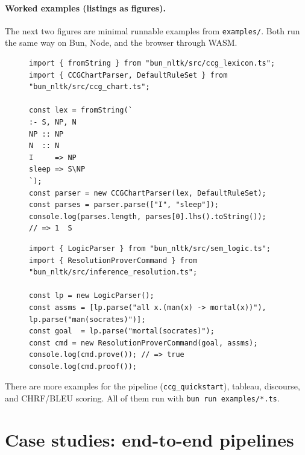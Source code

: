 \documentclass[smallextended]{svjour3}
\begin{document}
\paragraph{Worked examples (listings as figures).}

The next two figures are minimal runnable examples from \texttt{examples/}. Both run the same way on Bun, Node, and the browser through WASM.

\begin{figure}[H]
\begin{lstlisting}[caption={Example: CCG chart parse ``I sleep'' $\Rightarrow$ S (\texttt{examples/ccg\_quickstart.ts}).},label={lst:ccg}]
import { fromString } from "bun_nltk/src/ccg_lexicon.ts";
import { CCGChartParser, DefaultRuleSet } from "bun_nltk/src/ccg_chart.ts";

const lex = fromString(`
:- S, NP, N
NP :: NP
N  :: N
I     => NP
sleep => S\NP
`);
const parser = new CCGChartParser(lex, DefaultRuleSet);
const parses = parser.parse(["I", "sleep"]);
console.log(parses.length, parses[0].lhs().toString());
// => 1  S
\end{lstlisting}
\end{figure}

\begin{figure}[H]
\begin{lstlisting}[caption={Example: FOL resolution proves \texttt{mortal(socrates)} (\texttt{examples/inference\_resolution.ts}).},label={lst:inference}]
import { LogicParser } from "bun_nltk/src/sem_logic.ts";
import { ResolutionProverCommand } from "bun_nltk/src/inference_resolution.ts";

const lp = new LogicParser();
const assms = [lp.parse("all x.(man(x) -> mortal(x))"), lp.parse("man(socrates)")];
const goal  = lp.parse("mortal(socrates)");
const cmd = new ResolutionProverCommand(goal, assms);
console.log(cmd.prove()); // => true
console.log(cmd.proof());
\end{lstlisting}
\end{figure}

There are more examples for the pipeline (\texttt{ccg\_quickstart}), tableau, discourse, and CHRF/BLEU scoring. All of them run with \texttt{bun run examples/*.ts}.

\section{Case studies: end-to-end pipelines}
\label{sec:usecases}
\end{document}
